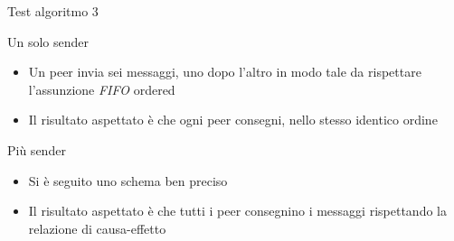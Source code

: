 \documentclass[
	usepdftitle=false,
	xcolor={table, dvipsnames},
	hyperref={
		pdftitle={Multicast totalmente e causalmente ordinato in Go},
    	pdfauthor={A. Chillotti}
    }
]{beamer}
\begin{document}
\begin{frame}{Test algoritmo 3}

\begin{block}{Un solo sender}
\begin{itemize}
\item Un peer invia sei messaggi, uno dopo l'altro in modo tale da rispettare l'assunzione \textit{FIFO} ordered
\item Il risultato aspettato è che ogni peer consegni, nello stesso identico ordine
\end{itemize}
\end{block}

\begin{block}{Più sender}
\begin{itemize}
\item Si è seguito uno schema ben preciso

\begin{figure}[ht!]
\centering
{}
\end{figure}
\item Il risultato aspettato è che tutti i peer consegnino i messaggi rispettando la relazione di causa-effetto
\end{itemize}
\end{block}

\end{frame}
\end{document}
